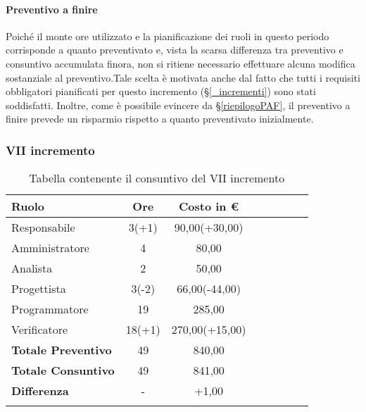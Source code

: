 \paragraph{Preventivo a finire}
Poiché il monte ore utilizzato e la pianificazione dei ruoli in questo periodo corrisponde a quanto preventivato e, vista la scarsa differenza tra preventivo e consuntivo accumulata finora, non si ritiene necessario effettuare alcuna modifica sostanziale al preventivo.Tale scelta è motivata anche dal fatto che tutti i requisiti obbligatori pianificati per questo incremento (\S\ref{_incrementi}) sono stati soddisfatti. Inoltre, come è possibile evincere da \S\ref{riepilogoPAF}, il preventivo a finire prevede un risparmio rispetto a quanto preventivato inizialmente.

\subsubsection{VII incremento}\label{_consuntivoImp4}
\begin{longtable}{|l|c|c|c|c|c|c|c|}
	\hline
	\rowcolor{lighter-grayer}
	\textbf{Ruolo}             & \textbf{Ore} & \textbf{Costo in €} \\
	\hline
	\endfirsthead

	\hline
	Responsabile               & 3(+1)           & 90,00(+30,00)              \\
	\hline
	\hline
	Amministratore             & 4       & 80,00      \\
	\hline
	\hline
	Analista                   & 2       & 50,00   \\
	\hline
	\hline
	Progettista                & 3(-2)            & 66,00(-44,00)              \\
	\hline
	\hline
	Programmatore              & 19         & 285,00                   \\
	\hline
	\hline
	Verificatore               & 18(+1)       & 270,00(+15,00)    \\
	\hline
	\textbf{Totale Preventivo} & 49          & 840,00            \\
	\hline
	\hline
	\textbf{Totale Consuntivo} & 49          & 841,00            \\
	\hline
	\hline
	\textbf{Differenza}        & -           & +1,00           \\
	\hline
	\rowcolor{white}
	\caption{Tabella contenente il consuntivo del VII incremento}
\end{longtable}
